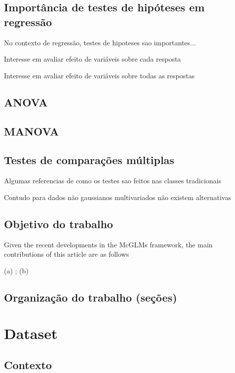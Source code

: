 \documentclass[AMA,STIX1COL]{WileyNJD-v2}
\begin{document}
\subsection{Importância de testes de hipóteses em regressão}

No contexto de regressão, testes de hipoteses sao importantes...

Interesse em avaliar efeito de variáveis sobre cada resposta

Interesse em avaliar efeito de variáveis sobre todas as respostas

\subsection{ANOVA}

\subsection{MANOVA}

\subsection{Testes de comparações múltiplas}

Algumas referencias de como os testes sao feitos nas classes tradicionais

Contudo para dados não gaussianos multivariados não existem alternativas

\subsection{Objetivo do trabalho}

Given the recent developments in the McGLMs framework, the main contributions of this article are as follows 

(a) ; (b)

\subsection{Organização do trabalho (seções)}



\section{Dataset}\label{sec2}

\subsection{Contexto}
\end{document}
